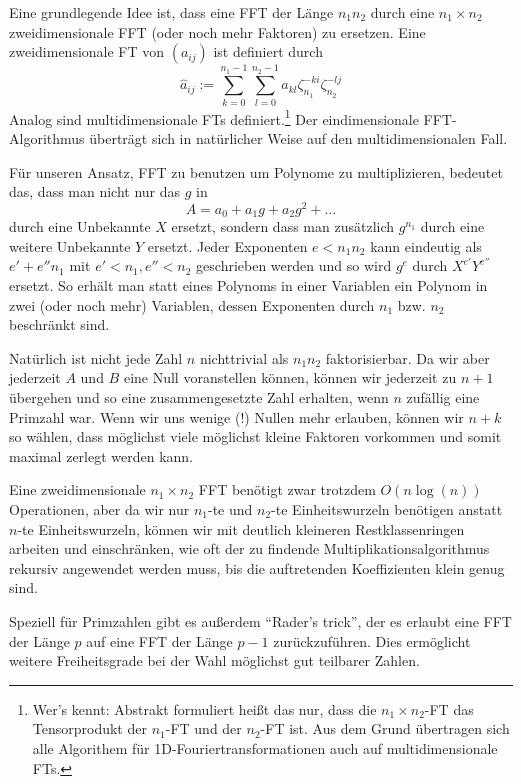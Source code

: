 \begin{remark}
    Eine grundlegende Idee ist, dass eine FFT der Länge $n_1 n_2$ durch eine $n_1\times n_2$ zweidimensionale FFT (oder noch mehr Faktoren) zu ersetzen. Eine zweidimensionale FT von $(a_{ij})$ ist definiert durch
    \[\hat{a}_{ij} := \sum_{k=0}^{n_1-1} \sum_{l=0}^{n_2-1} a_{kl} \zeta_{n_1}^{-ki} \zeta_{n_2}^{-lj}\]
    Analog sind multidimensionale FTs definiert.\footnote{Wer's kennt: Abstrakt formuliert heißt das nur, dass die $n_1\times n_2$-FT das Tensorprodukt der $n_1$-FT und der $n_2$-FT ist. Aus dem Grund übertragen sich alle Algorithem für 1D-Fouriertransformationen auch auf multidimensionale FTs.} Der eindimensionale FFT-Algorithmus überträgt sich in natürlicher Weise auf den multidimensionalen Fall.

    \medskip
    Für unseren Ansatz, FFT zu benutzen um Polynome zu multiplizieren, bedeutet das, dass man nicht nur das $g$ in
    \[A = a_0 + a_1 g + a_2 g^2 + \ldots\]
    durch eine Unbekannte $X$ ersetzt, sondern dass man zusätzlich $g^{n_1}$ durch eine weitere Unbekannte $Y$ ersetzt. Jeder Exponenten $e<n_1 n_2$ kann eindeutig als $e'+e'' n_1$ mit $e'<n_1, e''<n_2$ geschrieben werden und so wird $g^e$ durch $X^{e'} Y^{e''}$ ersetzt. So erhält man statt eines Polynoms in einer Variablen ein Polynom in zwei (oder noch mehr) Variablen, dessen Exponenten durch $n_1$ bzw. $n_2$ beschränkt sind.

    \medskip
    Natürlich ist nicht jede Zahl $n$ nichttrivial als $n_1 n_2$ faktorisierbar. Da wir aber jederzeit $A$ und $B$ eine Null voranstellen können, können wir jederzeit zu $n+1$ übergehen und so eine zusammengesetzte Zahl erhalten, wenn $n$ zufällig eine Primzahl war. Wenn wir uns wenige (!) Nullen mehr erlauben, können wir $n+k$ so wählen, dass möglichst viele möglichst kleine Faktoren vorkommen und somit maximal zerlegt werden kann.

    \medskip
    Eine zweidimensionale $n_1\times n_2$ FFT benötigt zwar trotzdem $O(n\log(n))$ Operationen, aber da wir nur $n_1$-te und $n_2$-te Einheitswurzeln benötigen anstatt $n$-te Einheitswurzeln, können wir mit deutlich kleineren Restklassenringen arbeiten und einschränken, wie oft der zu findende Multiplikationsalgorithmus rekursiv angewendet werden muss, bis die auftretenden Koeffizienten klein genug sind.
\end{remark}

\begin{remark}
    Speziell für Primzahlen gibt es außerdem \enquote{Rader's trick}, der es erlaubt eine FFT der Länge $p$ auf eine FFT der Länge $p-1$ zurückzuführen. Dies ermöglicht weitere Freiheitsgrade bei der Wahl möglichst gut teilbarer Zahlen.
\end{remark}

